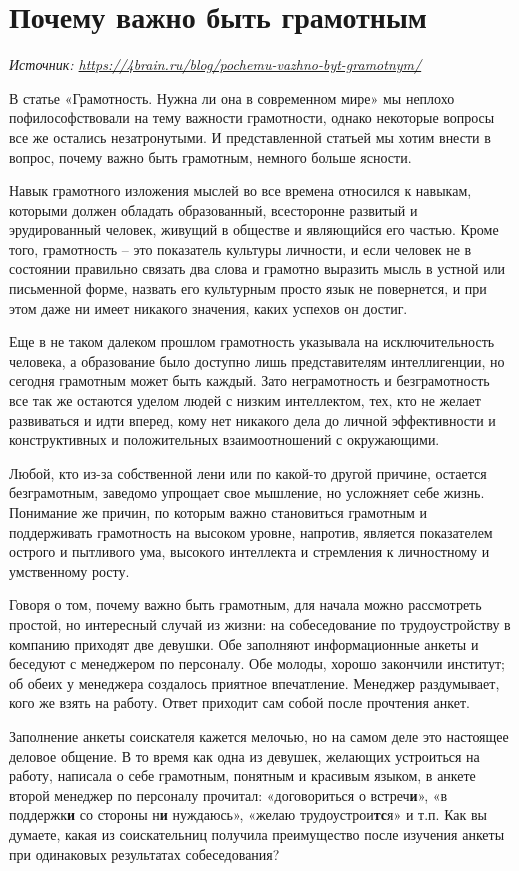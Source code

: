 \newpage
\section{Почему важно быть грамотным}

\textit{Источник: \url{https://4brain.ru/blog/pochemu-vazhno-byt-gramotnym/}}

В статье «Грамотность. Нужна ли она в современном мире» мы неплохо пофилософствовали на тему важности грамотности, однако некоторые вопросы все же остались незатронутыми. И представленной статьей мы хотим внести в вопрос, почему важно быть грамотным, немного больше ясности.

Навык грамотного изложения мыслей во все времена относился к навыкам, которыми должен обладать образованный, всесторонне развитый и эрудированный человек, живущий в обществе и являющийся его частью. Кроме того, грамотность – это показатель культуры личности, и если человек не в состоянии правильно связать два слова и грамотно выразить мысль в устной или письменной форме, назвать его культурным просто язык не повернется, и при этом даже ни имеет никакого значения, каких успехов он достиг.

Еще в не таком далеком прошлом грамотность указывала на исключительность человека, а образование было доступно лишь представителям интеллигенции, но сегодня грамотным может быть каждый. Зато неграмотность и безграмотность все так же остаются уделом людей с низким интеллектом, тех, кто не желает развиваться и идти вперед, кому нет никакого дела до личной эффективности и конструктивных и положительных взаимоотношений с окружающими.

Любой, кто из-за собственной лени или по какой-то другой причине, остается безграмотным, заведомо упрощает свое мышление, но усложняет себе жизнь. Понимание же причин, по которым важно становиться грамотным и поддерживать грамотность на высоком уровне, напротив, является показателем острого и пытливого ума, высокого интеллекта и стремления к личностному и умственному росту.

Говоря о том, почему важно быть грамотным, для начала можно рассмотреть простой, но интересный случай из жизни: на собеседование по трудоустройству в компанию приходят две девушки. Обе заполняют информационные анкеты и беседуют с менеджером по персоналу. Обе молоды, хорошо закончили институт; об обеих у менеджера создалось приятное впечатление. Менеджер раздумывает, кого же взять на работу. Ответ приходит сам собой после прочтения анкет.

Заполнение анкеты соискателя кажется мелочью, но на самом деле это настоящее деловое общение. В то время как одна из девушек, желающих устроиться на работу, написала о себе грамотным, понятным и красивым языком, в анкете второй менеджер по персоналу прочитал: «договориться о встреч\textbf{и}», «в поддержк\textbf{и} со стороны н\textbf{и} нуждаюсь», «желаю трудоустрои\textbf{тс}я» и т.п. Как вы думаете, какая из соискательниц получила преимущество после изучения анкеты при одинаковых результатах собеседования?

